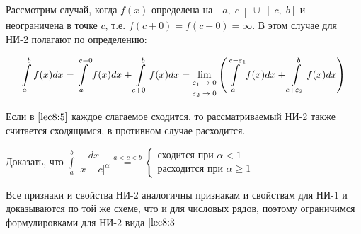 \documentclass[../../main.tex]{subfiles}
\begin{document}
Рассмотрим случай, когда $f(x)$ определена на $\left[a,\; c \right[ \cup \left] c,\; b \right]$ и неограничена в точке $c$, т.е. $f(c + 0) = f(c - 0) = \infty$. В этом случае для НИ-2 полагают по определению:

\begin{equation} \label{lec8:5}
\int\limits_{a}^{b}f(x)dx = \int\limits_{a}^{c - 0}f(x)dx + \int\limits_{c + 0}^{b}f(x)dx = \underset{\scriptsize{
\begin{gathered}
\varepsilon_1 \to 0\\
\varepsilon_2 \to 0                                                                                                                                                                                                                 \end{gathered}}}
\lim\left(\int\limits_{a}^{c - \varepsilon_1}f(x)dx + \int\limits_{c + \varepsilon_2}^{b}f(x)dx\right)
\end{equation}

Если в $\eqref{lec8:5}$ каждое слагаемое сходится, то рассматриваемый НИ-2 также считается сходящимся, в противном случае расходится.

\begin{exc}
 Доказать, что $\displaystyle\int\limits_{a}^{b} \dfrac{dx}{|x - c|^{\alpha}} \overset{a < c < b} = \begin{cases}
 \text{сходится при } \alpha < 1\\
 \text{расходится при } \alpha \geq 1
 \end{cases}$ 
\end{exc}

Все признаки и свойства НИ-2 аналогичны признакам и свойствам для НИ-1 и доказываются по той же схеме, что и для числовых рядов, поэтому ограничимся формулировками для НИ-2 вида $\eqref{lec8:3}$
\end{document}

